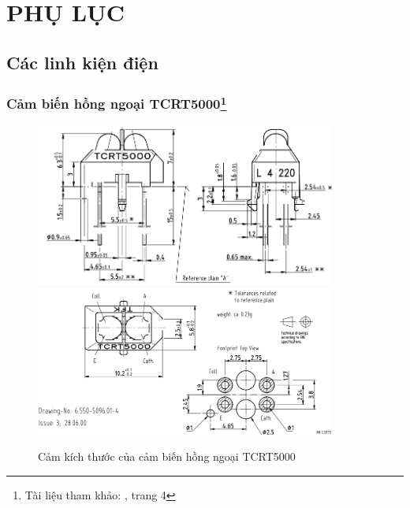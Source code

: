 \chapter*{PHỤ LỤC}
\setcounter{figure}{0}
\setcounter{table}{0}
\renewcommand{\thefigure}{A.\arabic{figure}}
\renewcommand{\thetable}{A.\arabic{table}}
    \section{Các linh kiện điện}
        \subsection[Cảm biến hồng ngoại TCRT5000]{Cảm biến hồng ngoại TCRT5000\footnote{Tài liệu tham khảo: \cite{vishay_tcrt5000_1}, trang 4}}
            \begin{figure}[H]
                \centering
                \includegraphics[width=0.88\textwidth]{pictures/appendix/app_p1_TCRT5000Dimensions1.png}
                \includegraphics[width=0.88\textwidth]{pictures/appendix/app_p2_TCRT5000Dimensions2.png}
                \caption{Cảm kích thước của cảm biến hồng ngoại TCRT5000}
                \label{fig:TCRT5000}
            \end{figure}
